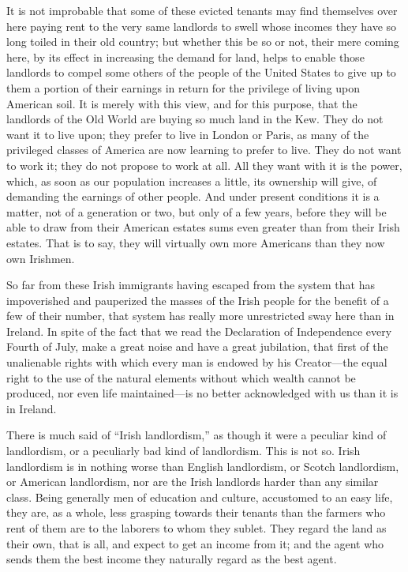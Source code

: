 \documentclass{book}
\begin{document}
It is not improbable that some of these evicted tenants may find themselves over here paying rent to the very same landlords to swell whose incomes they have so long toiled in their old country; but whether this be so or not, their mere coming here, by its effect in increasing the demand for land, helps to enable those landlords to compel some others of the people of the United States to give up to them a portion of their earnings in return for the privilege of living upon American soil. It is merely with this view, and for this purpose, that the landlords of the Old World are buying so much land in the Kew. They do not want it to live upon; they prefer to live in London or Paris, as many of the privileged classes of America are now learning to prefer to live. They do not want to work it; they do not propose to work at all. All they want with it is the power, which, as soon as our population increases a little, its ownership will give, of demanding the earnings of other people. And under present conditions it is a matter, not of a generation or two, but only of a few years, before they will be able to draw from their American estates sums even greater than from their Irish estates. That is to say, they will virtually own more Americans than they now own Irishmen.

So far from these Irish immigrants having escaped from the system that has impoverished and pauperized the masses of the Irish people for the benefit of a few of their number, that system has really more unrestricted sway here than in Ireland. In spite of the fact that we read the Declaration of Independence every Fourth of July, make a great noise and have a great jubilation, that first of the unalienable rights with which every man is endowed by his Creator—the equal right to the use of the natural elements without which wealth cannot be produced, nor even life maintained—is no better acknowledged with us than it is in Ireland.

There is much said of “Irish landlordism,” as though it were a peculiar kind of landlordism, or a peculiarly bad kind of landlordism. This is not so. Irish landlordism is in nothing worse than English landlordism, or Scotch landlordism, or American landlordism, nor are the Irish landlords harder than any similar class. Being generally men of education and culture, accustomed to an easy life, they are, as a whole, less grasping towards their tenants than the farmers who rent of them are to the laborers to whom they sublet. They regard the land as their own, that is all, and expect to get an income from it; and the agent who sends them the best income they naturally regard as the best agent.
\end{document}
